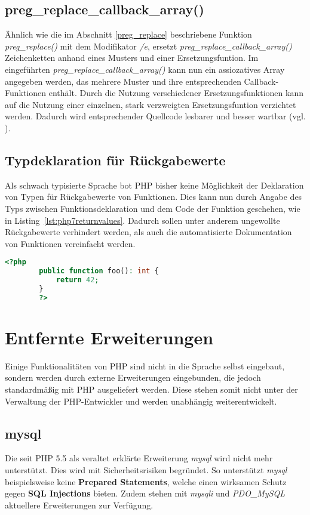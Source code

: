     \subsection{preg\_replace\_callback\_array()}
    Ähnlich wie die im Abschnitt \ref{preg_replace} beschriebene Funktion \textit{preg\_replace()} mit dem Modifikator \textit{/e}, ersetzt 
    \textit{preg\_replace\_callback\_array()} Zeichenketten anhand eines Musters und einer Ersetzungsfuntion. Im eingeführten \textit{preg\_replace\_callback\_array()} 
    kann nun ein assiozatives Array angegeben werden, das mehrere Muster und ihre entsprechenden Callback-Funktionen enthält. Durch die Nutzung verschiedener 
    Ersetzungsfunktionen kann auf die Nutzung einer einzelnen, stark verzweigten Ersetzungsfuntion verzichtet werden. Dadurch wird entsprechender Quellcode lesbarer 
    und besser wartbar (vgl. \cite[S. 34f]{martin_clean_2012}).

    \subsection{Typdeklaration für Rückgabewerte} %
    Als schwach typisierte Sprache bot \acs{PHP} bisher keine Möglichkeit der Deklaration von Typen für Rückgabewerte von Funktionen. Dies kann nun durch Angabe des
    Typs zwischen Funktionsdeklaration und dem Code der Funktion geschehen, wie in Listing~\ref{lst:php7returnvalues}. Dadurch sollen unter anderem ungewollte Rückgabewerte verhindert werden, als auch die 
    automatisierte Dokumentation von Funktionen vereinfacht werden. \cite{morrison_php:_2014-1} 

    \begin{lstlisting}[language=php, caption={Typdeklaration für Rückgabewerte}, label={lst:php7returnvalues}]
        <?php
        public function foo(): int {
            return 42;
        }
        ?>
    \end{lstlisting}

\section{Entfernte Erweiterungen}
Einige Funktionalitäten von \acs{PHP} sind nicht in die Sprache selbst eingebaut, sondern werden durch externe Erweiterungen eingebunden, die jedoch standardmäßig
mit \acs{PHP} ausgeliefert werden. Diese stehen somit nicht unter der Verwaltung der \acs{PHP}-Entwickler und werden unabhängig weiterentwickelt.
    \subsection{mysql}
    Die seit \acs{PHP} 5.5 als veraltet erklärte Erweiterung \textit{mysql} wird nicht mehr unterstützt. Dies wird mit Sicherheitsrisiken begründet. So unterstützt
    \textit{mysql} beispielsweise keine \textbf{Prepared Statements}, welche einen wirksamen Schutz gegen \textbf{SQL Injections} bieten. \cite{oracle_mysql_nodate}
    Zudem stehen mit \textit{mysqli} und \textit{PDO\_MySQL} aktuellere Erweiterungen zur Verfügung.
    
